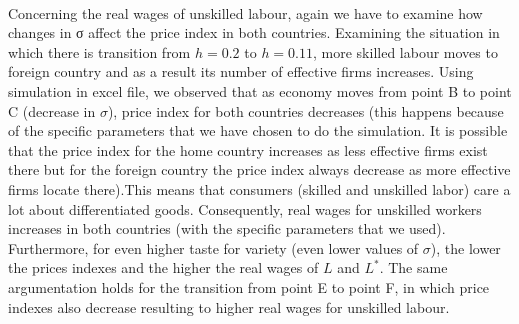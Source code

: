 \documentclass[11pt]{article}
\begin{document}
\\ 
Concerning the real wages of unskilled labour, again we have to examine how changes in σ affect the price index in both countries. Examining the situation in which there is transition from $h=0.2$ to $h=0.11$, more skilled labour moves to foreign country and as a result its number of effective firms increases. Using simulation in excel file, we observed that as economy moves from point B to point C (decrease in $\sigma$), price index for both countries decreases (this happens because of the specific parameters that we have chosen to do the simulation. It is possible that the price index for the home country increases as less effective firms exist there but for the foreign country the price index always decrease as more effective firms locate there).This means that consumers (skilled and unskilled labor) care a lot about differentiated goods. Consequently, real wages for unskilled workers increases in both countries (with the specific parameters that we used). Furthermore, for even higher taste for variety (even lower values of $\sigma$), the lower the prices indexes and the higher the real wages of $L$ and $L^{\ast}$. The same argumentation holds for the transition from point E to point F, in which price indexes also decrease resulting to higher real wages for unskilled labour.
\end{document}
